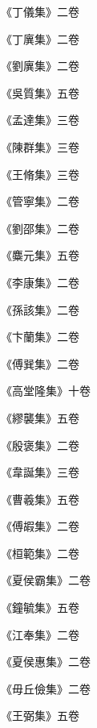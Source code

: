\begin{pinyinscope}
 《丁儀集》二卷



 《丁廙集》二卷



 《劉廙集》二卷



 《吳質集》五卷



 《孟達集》三卷



 《陳群集》三卷



 《王脩集》三卷



 《管寧集》二卷



 《劉邵集》二卷



 《麋元集》五卷



 《李康集》二卷



 《孫該集》二卷



 《卞蘭集》二卷



 《傅巽集》二卷



 《高堂隆集》十卷



 《繆襲集》五卷



 《殷褒集》二卷



 《韋誕集》三卷



 《曹羲集》五卷



 《傅嘏集》二卷



 《桓範集》二卷



 《夏侯霸集》二卷



 《鐘毓集》五卷



 《江奉集》二卷



 《夏侯惠集》二卷



 《毋丘儉集》二卷



 《王弼集》五卷




\end{pinyinscope}
